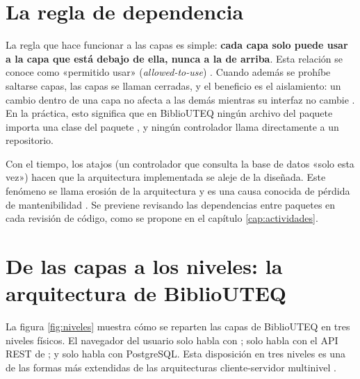 \section{La regla de dependencia}\label{sec:regla}

La regla que hace funcionar a las capas es simple: \textbf{cada capa solo puede usar a la capa que está debajo de ella, nunca a la de arriba}. Esta relación se conoce como «permitido usar» (\emph{allowed-to-use}) \cite{bass2021software}. Cuando además se prohíbe saltarse capas, las capas se llaman cerradas, y el beneficio es el aislamiento: un cambio dentro de una capa no afecta a las demás mientras su interfaz no cambie \cite{richards2025fundamentals}. En la práctica, esto significa que en BiblioUTEQ ningún archivo del paquete  importa una clase del paquete , y ningún controlador llama directamente a un repositorio.

\begin{avisoBox}[title={La erosión de la arquitectura}]
	Con el tiempo, los atajos (un controlador que consulta la base de datos «solo esta vez») hacen que la arquitectura implementada se aleje de la diseñada. Este fenómeno se llama erosión de la arquitectura y es una causa conocida de pérdida de mantenibilidad \cite{li2022understanding}. Se previene revisando las dependencias entre paquetes en cada revisión de código, como se propone en el capítulo \ref{cap:actividades}.
\end{avisoBox}

\section{De las capas a los niveles: la arquitectura de BiblioUTEQ}

La figura \ref{fig:niveles} muestra cómo se reparten las capas de BiblioUTEQ en tres niveles físicos. El navegador del usuario solo habla con ;  solo habla con el API REST de ; y solo  habla con PostgreSQL. Esta disposición en tres niveles es una de las formas más extendidas de las arquitecturas cliente-servidor multinivel \cite{vansteen2023distributed}.


